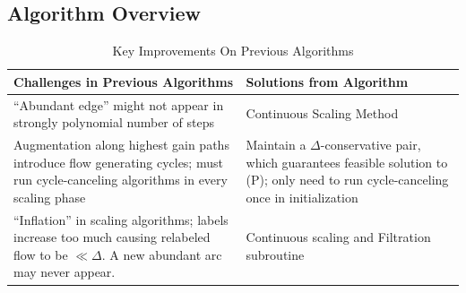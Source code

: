 \documentclass[11pt]{article}
\theoremstyle{definition}
\theoremstyle{definition}
\begin{document}
	\subsection{Algorithm Overview} 
	\begin{table}[H]
	\begin{center}
	    \begin{tabular}{ | p{7cm} | p{7cm} |}
	    \hline
	    Challenges in Previous Algorithms  & Solutions from Algorithm \\ \hline
	    ``Abundant edge'' might not appear in strongly polynomial number of steps \cite{Radzik2004} & Continuous Scaling Method  \\ \hline
	    Augmentation along highest gain paths introduce flow generating cycles; must run cycle-canceling algorithms in every scaling phase \cite{Goldberg:1991:CAG:105014.105022} & Maintain a $\Delta$-conservative pair, which guarantees feasible solution to (P); only need to run cycle-canceling once in initialization  \\ \hline
	    ``Inflation'' in scaling algorithms; labels increase too much causing relabeled flow to be $\ll \Delta$. A new abundant arc may never appear. & Continuous scaling and Filtration subroutine \\
	    \hline
	    \end{tabular}
	\end{center}
	\caption{Key Improvements On Previous Algorithms}
	\label{tab:improvementsInitial}
	\end{table}
\end{document}
